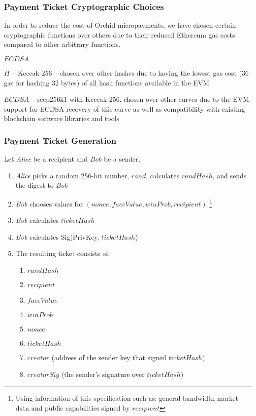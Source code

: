 \subsubsection{Payment Ticket Cryptographic Choices}
\label{payments-optimization}
In order to reduce the cost of Orchid micropayments, we have chosen certain cryptographic functions over others due to their reduced Ethereum gas costs compared to other arbitrary functions.
\begin{labeling}{$ECDSA$}
    \item[$H$] -- Keccak-256 -- chosen over other hashes due to having the lowest gas cost (36 gas\cite{ETHSpec} for hashing 32 bytes) of all hash functions available in the EVM
    \item[$ECDSA$] -- secp256k1 with Keccak-256, chosen over other curves due to the EVM support for ECDSA recovery of this curve as well as compatibility with existing blockchain software libraries and tools
\end{labeling}

\subsubsection{Payment Ticket Generation}
\label{payment-generation}

Let \textit{Alice} be a recipient and \textit{Bob} be a sender,
\begin{enumerate}
  \item \textit{Alice} picks a random 256-bit number, $rand$, calculates $randHash$, and sends the digest to \textit{Bob}
  \item \textit{Bob} chooses values for $(nonce, faceValue, winProb, recipient)$ \footnote{Using information of this specification such as: general bandwidth market data and public capabilities signed by $recipient$}
  \item \textit{Bob} calculates $ticketHash$
  \item \textit{Bob} calculates Sig(PrivKey, $ticketHash$)
  \item The resulting ticket consists of:
    \begin{enumerate}
      \item $randHash$
      \item $recipient$
      \item $faceValue$
      \item $winProb$
      \item $nonce$
      \item $ticketHash$
      \item $creator$ (address of the sender key that signed $ticketHash$)
      \item $creatorSig$ (the sender's signature over $ticketHash$)
     \end{enumerate}
\end{enumerate}

